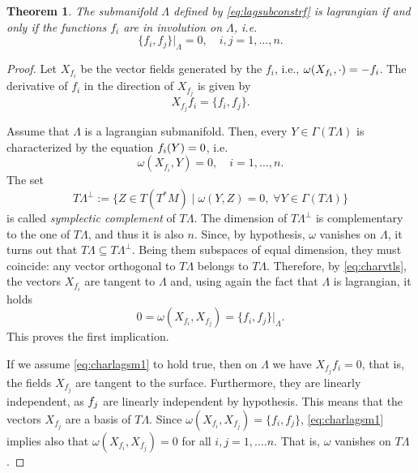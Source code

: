 \documentclass[english,fontsize=11pt,paper=a5,oneside]{scrbook}
\let\d\relax
\newcommand{\d}{\mathrm{d}}
\newtheorem{theorem}{Theorem}[chapter]
\theoremstyle{definition}
\begin{document}
\begin{theorem}
  The submanifold $\Lambda$ defined by \eqref{eq:lagsubconstrf} is lagrangian if and only if the functions $f_i$ are in involution on $\Lambda$, i.e.
  \begin{equation}\label{eq:charlagsm1}
    \big\{f_i, f_j\big\}\big|_\Lambda = 0, \quad i,j = 1,\ldots,n.
  \end{equation}
\end{theorem}
\begin{proof}
  Let $X_{f_i}$ be the vector fields generated by the $f_i$, i.e., $\omega(X_{f_i}, \cdot)=-\d f_i$. The derivative of $f_i$ in the direction of $X_{f_j}$ is given by
  \begin{equation}
    X_{f_j}f_i = \big\{f_i,f_j\big\}.
  \end{equation}

  Assume that $\Lambda$ is a lagrangian submanifold.
  Then, every $Y\in \Gamma(T\Lambda)$ is characterized by the equation $\d f_i(Y) = 0$, i.e.
  \begin{equation}\label{eq:charvtls}
    \omega(X_{f_i}, Y) = 0, \quad i=1,\ldots,n.
  \end{equation}
  The set
  \begin{equation}
    T\Lambda^\perp := \big\{Z\in T(T^*M) \mid \omega(Y,Z) = 0, \; \forall Y\in \Gamma(T\Lambda)\big\}
  \end{equation}
  is called \emph{symplectic complement} of $T\Lambda$. The dimension of $T\Lambda^\perp$ is complementary to the one of $T\Lambda$, and thus it is also $n$. Since, by hypothesis, $\omega$ vanishes on $\Lambda$, it turns out that $T\Lambda \subseteq T\Lambda^\perp$. Being them subspaces of equal dimension, they must coincide: any vector orthogonal to $T\Lambda$ belongs to $T\Lambda$.
  Therefore, by \eqref{eq:charvtls}, the vectors $X_{f_i}$ are tangent to $\Lambda$ and, using again the fact that $\Lambda$ is lagrangian, it holds
  \begin{equation}
    0 = \omega(X_{f_i}, X_{f_j}) = \big\{f_i, f_j\big\}\big|_\Lambda.
  \end{equation}
  This proves the first implication.

  If we assume \eqref{eq:charlagsm1} to hold true, then on $\Lambda$ we have $X_{f_j}f_i = 0$, that is, the fields $X_{f_j}$ are tangent to the surface. Furthermore, they are linearly independent, as $\d f_j$ are linearly independent by hypothesis.
  This means that the vectors $X_{f_j}$ are a basis of $T\Lambda$.
  Since $\omega(X_{f_i}, X_{f_j}) = \big\{f_i,f_j\big\}$, \eqref{eq:charlagsm1} implies also that $\omega(X_{f_i}, X_{f_j}) = 0$ for all $i,j=1,\ldots.n$. That is, $\omega$ vanishes on $T\Lambda$.
\end{proof}
\end{document}
